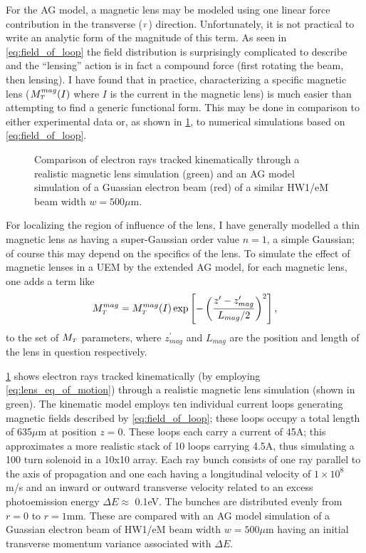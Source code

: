 For the AG model, a magnetic lens may be modeled using one linear force contribution in the transverse ($ {\scriptscriptstyle T} $) direction.
Unfortunately, it is not practical to write an analytic form of the magnitude of this term.
As seen in \ref{eq:field_of_loop} the field distribution is surprisingly complicated to describe and the ``lensing'' action is in fact a compound force (first rotating the beam, then lensing).
I have found that in practice, characterizing a specific magnetic lens ($M_{{\scriptscriptstyle T}}^{mag}(I)$ where $I$ is the current in the magnetic lens) is much easier than attempting to find a generic functional form.
This may be done in comparison to either experimental data or, as shown in \ref{fig:mag_lens_loops}, to numerical simulations based on \ref{eq:field_of_loop}.

\begin{figure}
  \centering
  
  \caption[Comparison of the AG model and a kinematic model of a magnetic lens]{
    Comparison of electron rays tracked kinematically through a realistic magnetic lens simulation (green) and an AG model simulation of a Guassian electron beam (red) of a similar HW1/eM beam width $ w = 500 \mu\text{m} $.
  }
  \label{fig:mag_lens_loops}
\end{figure}

For localizing the region of influence of the lens, I have generally modelled a thin magnetic lens as having a super-Gaussian order value $n=1$, a simple Gaussian; of course this may depend on the specifics of the lens.
To simulate the effect of magnetic lenses in a UEM by the extended AG model, for each magnetic lens, one adds a term like
\begin{equation}
  M_{{\scriptscriptstyle T}}^{mag} = M_{{\scriptscriptstyle T}}^{mag}(I) \exp \left [ - \left (  \frac{ z^{\prime} - z_{mag}^{\prime} }{ L_{mag} / 2 } \right )^{ 2 } \right ] \text{,}
\end{equation}
to the set of $M_{{\scriptscriptstyle T}}$ parameters, where $z_{mag}^{\prime}$ and $L_{mag}$ are the position and length of the lens in question respectively.

\ref{fig:mag_lens_loops} shows electron rays tracked kinematically (by employing \ref{eq:lens_eq_of_motion}) through a realistic magnetic lens simulation (shown in green).
The kinematic model employs ten individual current loops generating magnetic fields described by \ref{eq:field_of_loop}; these loops occupy a total length of 635$\mu$m at position $z=0$.
These loops each carry a current of 45A; this approximates a more realistic stack of 10 loops carrying 4.5A, thus simulating a  100 turn solenoid in a 10x10 array.
Each ray bunch consists of one ray parallel to the axis of propagation and one each having a longitudinal velocity of $1 \times 10^{8}$ m/s and an inward or outward transverse velocity related to an excess photoemission energy $\Delta E \approx $ 0.1eV.
The bunches are distributed evenly from $r=0$ to $r = 1$mm.
These are compared with an AG model simulation of a Guassian electron beam of HW1/eM beam width $ w = 500 \mu\text{m} $ having an initial transverse momentum variance associated with $\Delta E$.

